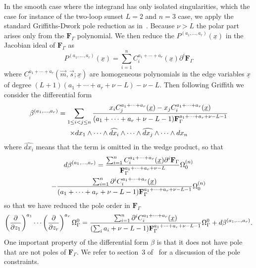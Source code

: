 \documentclass[a4paper,12pt]{article}
\numberwithin{equation}{section}
\numberwithin{figure}{subsection}
\theoremstyle{plain}
\theoremstyle{plain}
\theoremstyle{definition}
\theoremstyle{plain}
\theoremstyle{remark}
\theoremstyle{plain}
\begin{document}
 In the smooth case where the integrand has only isolated singularities, which the case for instance of  the two-loop
 sunset $L=2$ and $n=3$ case,  we apply the standard Griffiths-Dwork
 pole reduction as in~\cite{Bloch:2016izu}. Because  $\nu>L$ the polar part arises
 only from the $\textbf{F}_\Gamma$ polynomial. 
 We then reduce the  $   P^{(a_1,\dots,a_r)}(\underline x)$ in the
 Jacobian ideal of $\textbf{F}_\Gamma$  as
 \begin{equation}\label{e:GD}
     P^{(a_1,\dots,a_r)}(\underline x) = \sum_{i=1}^n  C^{a_1+\cdots+a_r}_i
     (\underline x)
     \partial^i \textbf{F}_\Gamma
   \end{equation}
   where $ C^{a_1+\cdots+a_r}_i
     (\vec m,\vec s;\underline x)$ are homogeneous polynomials in the
     edge variables $\underline x$ of degree $(L+1)(a_1+\cdots+a_r+\nu-L)-\nu-L$.
   Then following Griffith we consider the differential form
   \begin{multline}\label{e:betadef}
  \beta^{(a_1,\dots,a_r)}=  \sum_{1\leq i<j\leq n} {x_i
    C^{a_1+\cdots+a_r}_j  (\underline x)-x_j
    C^{a_1+\cdots+a_r}_i(\underline x)\over  (a_1+\cdots+a_r+\nu-L-1)\textbf{F}_\Gamma^{a_1+\cdots+a_r+\nu-L-1}}\cr\times
 dx_1\wedge \cdots \wedge \widehat{dx_i}\wedge \cdots \wedge\widehat{dx_j}\wedge
  \cdots \wedge dx_n
   \end{multline}
where $\widehat{dx_i}$ means that the term is omitted in the wedge
product,   so that
   \begin{multline}
     d\beta^{(a_1,\dots,a_r)}= {    \sum_{i=1}^n  C^{a_1+\cdots+a_r}_i
     (\underline x)
     \partial^i \textbf{F}_\Gamma\over
     \textbf{F}_\Gamma^{a_1+\cdots+a_r+\nu-L}}\Omega_0^{(n)}\cr-{
     \sum_{i=1}^n  \partial ^i C^{a_1+\cdots+a_r}_i
     (\underline x)
    \over    (a_1+\cdots+a_r+\nu-L-1)\textbf{F}_\Gamma^{a_1+\cdots+a_r+\nu-L-1}} \Omega_0^{(n)}
   \end{multline}
   so that we have reduced the pole order  in $ \textbf{F}_\Gamma$
   \begin{equation}\label{e:GDstart}
\left(\partial\over \partial z_1\right)^{a_1}\cdots\left(\partial
  \over\partial z_r\right)^{a_r} \Omega^0_\Gamma= {\sum_{i=1}^n
  \partial^i C^{a_1+\cdots+a_r}_i(\underline x)
  \over   (\sum_i a_i+\nu-L-1)\textbf{F}_\Gamma^{a_1+\cdots +a_r+\nu-L-1}}   \Omega_\Gamma^0+d\beta^{(a_1,\dots,a_r)}.
\end{equation}
One important property of the differential form $\beta$ is that it
does not have pole that are not poles of $\textbf{F}_\Gamma$. We refer
to section~3 of~\cite{Lairez:2022zkj} for a discussion of the pole constraints.
\end{document}

